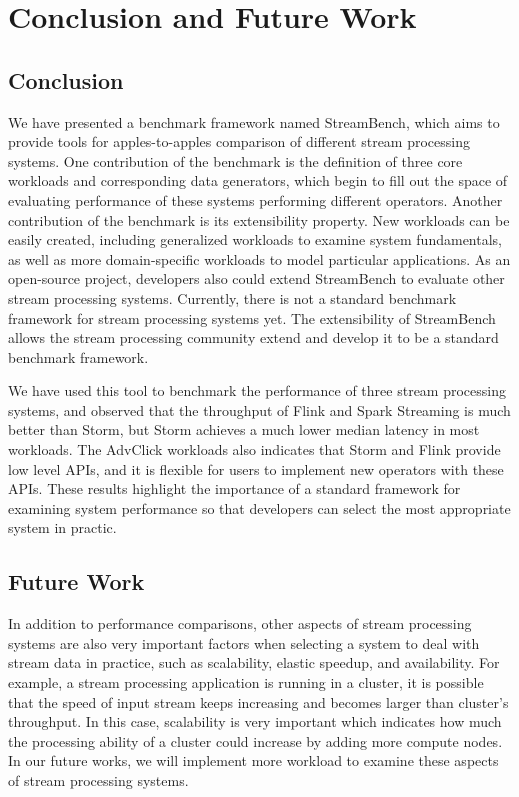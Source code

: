 \chapter{Conclusion and Future Work}

\section{Conclusion}

We have presented a benchmark framework named StreamBench, which aims to provide tools for apples-to-apples comparison of different stream processing systems. One contribution of the benchmark is the definition of three core workloads and corresponding data generators, which begin to fill out the space of evaluating performance of these systems performing different operators. Another contribution of the benchmark is its extensibility property. New workloads can be easily created, including generalized workloads to examine system fundamentals, as well as more domain-specific workloads to model particular applications. As an open-source project, developers also could extend StreamBench to evaluate other stream processing systems. Currently, there is not a standard benchmark framework for stream processing systems yet. The extensibility of StreamBench allows the stream processing community extend and develop it to be a standard benchmark framework. 

We have used this tool to benchmark the performance of three stream processing systems, and observed that the throughput of Flink and Spark Streaming is much better than Storm, but Storm achieves a much lower median latency in most workloads. The AdvClick workloads also indicates that Storm and Flink provide low level APIs, and it is flexible for users to implement new operators with these APIs. These results highlight the importance of a standard framework for examining system performance so that developers can select the most appropriate system in practic.

\section{Future Work}

In addition to performance comparisons, other aspects of stream processing systems are also very important factors when selecting a system to deal with stream data in practice, such as scalability, elastic speedup, and availability. For example, a stream processing application is running in a cluster, it is possible that the speed of input stream keeps increasing and becomes larger than cluster's throughput. In this case, scalability is very important which indicates how much the processing ability of a cluster could increase by adding more compute nodes. In our future works, we will implement more workload to examine these aspects of stream processing systems.

